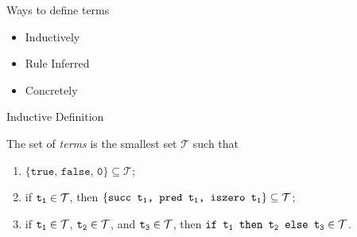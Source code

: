 \begin{frame}{Ways to define terms}
\begin{itemize}
  \item Inductively
  \item Rule Inferred
  \item Concretely
\end{itemize}
\end{frame}

\begin{frame}{Inductive Definition}
\begin{definition}
The set of \textit{terms} is the smallest set $\mathcal{T}$ such that
\begin{enumerate}
  \item $\{ \texttt{true, false, 0} \} \subseteq \mathcal{T}$;
  \item if $\texttt{t\textsubscript{1}} \in \mathcal{T}$, then $\{ \texttt{succ t\textsubscript{1}, pred t\textsubscript{1}, iszero t\textsubscript{1}} \} \subseteq \mathcal{T}$;
  \item if $\texttt{t\textsubscript{1}} \in \mathcal{T}$, $\texttt{t\textsubscript{2}} \in \mathcal{T}$, and $\texttt{t\textsubscript{3}} \in \mathcal{T}$, then $\texttt{if t\textsubscript{1} then t\textsubscript{2} else t\textsubscript{3}} \in \mathcal{T}$.
\end{enumerate}
\end{definition}
\end{frame}

